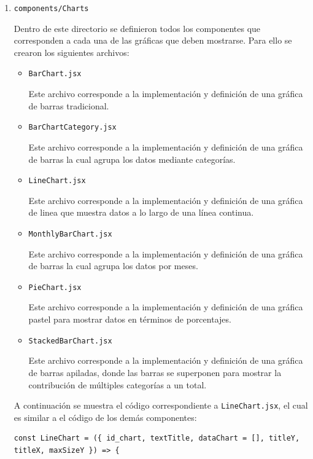\begin{enumerate}
\item \texttt{components/Charts}

Dentro de este directorio se definieron todos los componentes que corresponden a cada una de las gráficas que deben mostrarse. Para ello se crearon los siguientes archivos:

\begin{itemize}
    \item \texttt{BarChart.jsx}

    Este archivo corresponde a la implementación y definición de una gráfica de barras tradicional.
    
    \item \texttt{BarChartCategory.jsx}

    Este archivo corresponde a la implementación y definición de una gráfica de barras la cual agrupa los datos mediante categorías.
    
    \item \texttt{LineChart.jsx}

    Este archivo corresponde a la implementación y definición de una gráfica de linea que muestra datos a lo largo de una línea continua.
    
    \item \texttt{MonthlyBarChart.jsx}

    Este archivo corresponde a la implementación y definición de una gráfica de barras la cual agrupa los datos por meses.
    
    \item \texttt{PieChart.jsx}

    Este archivo corresponde a la implementación y definición de una gráfica pastel para mostrar datos en términos de porcentajes.
    
    \item \texttt{StackedBarChart.jsx}

    Este archivo corresponde a la implementación y definición de una gráfica de barras apiladas, donde las barras se superponen para mostrar la contribución de múltiples categorías a un total.
\end{itemize}

A continuación se muestra el código correspondiente a \texttt{LineChart.jsx}, el cual es similar a el código de los demás componentes:

\begin{verbatim}
const LineChart = ({ id_chart, textTitle, dataChart = [], titleY, titleX, maxSizeY }) => {


\end{verbatim}
\end{enumerate}
